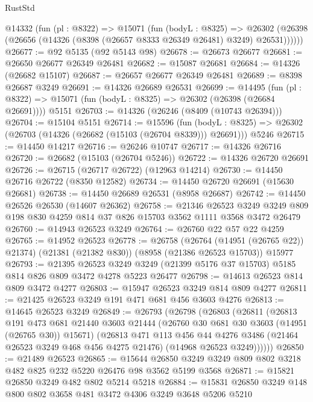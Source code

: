 \begin{lexlean}{RustStd}
\begin{coremodule}
    @14332
      (fun (pl : @8322) =>
      @15071
        (fun (bodyL : @8325) =>
        @26302 (@26398 (@26656 (@14326 (@8398 (@26657 @8333 @26349 @26481) @3249) @26531))))))
@26677 := @92 @5135 (@92 @5143 @98)
@26678 := @26673 @26677
@26681 := @26650 @26677 @26349 @26481
@26682 := @15087 @26681
@26684 := @14326 (@26682 @15107)
@26687 := @26657 @26677 @26349 @26481
@26689 := @8398 @26687 @3249
@26691 := @14326 @26689 @26531
@26699 := @14495
    (fun (pl : @8322) => @15071 (fun (bodyL : @8325) => @26302 (@26398 (@26684 @26691))))
    @5151
@26703 := @14326 (@26246 (@8409 (@10743 @26394)))
@26704 := @15104 @5151
@26714 := @15596
    (fun (bodyL : @8325) => @26302 (@26703 (@14326 (@26682 (@15103 (@26704 @8339))) @26691)))
    @5246
@26715 := @14450 @14217
@26716 := @26246 @10747
@26717 := @14326 @26716
@26720 := @26682 (@15103 (@26704 @5246))
@26722 := @14326 @26720 @26691
@26726 := @26715 (@26717 @26722) (@12963 @14214)
@26730 := @14450 @26716 @26722 (@8350 @12582)
@26734 := @14450 @26720 @26691 (@15630 @26681)
@26738 := @14450 @26689 @26531 (@8958 @26687)
@26742 := @14450 @26526 @26530 (@14607 @26362)
@26758 := @21346
    @26523
    @3249
    @3249
    @809
    @198
    @830
    @4259
    @814
    @37
    @826
    @15703
    @3562
    @1111
    @3568
    @3472
    @26479
@26760 := @14943 @26523 @3249
@26764 := @26760 @22 @57 @22 @4259
@26765 := @14952 @26523
@26778 := @26758
    (@26764 (@14951 (@26765 @22)) @21374)
    (@21381 (@21382 @830))
    (@8958 (@21386 @26523 @15703))
    @15977
@26793 := @21395
    @26523
    @3249
    @3249
    (@21399 @5176 @37 @15703)
    @5185
    @814
    @826
    @809
    @3472
    @4278
    @5223
    @26477
@26798 := @14613 @26523 @814 @809 @3472 @4277
@26803 := @15947 @26523 @3249 @814 @809 @4277
@26811 := @21425 @26523 @3249 @191 @471 @681 @456 @3603 @4276
@26813 := @14645 @26523 @3249
@26849 := @26793
    (@26798
      (@26803
        (@26811
          (@26813
            @191
            @473
            @681
            @21440
            @3603
            @21444
            (@26760 @30 @681 @30 @3603 (@14951 (@26765 @30)) @15671)
            (@26813
              @471
              @113
              @456
              @44
              @4276
              @3486
              (@21464 @26523 @3249 @468 @456 @4275 @21476)
              (@14968 @26523 @3249))))))
@26850 := @21489 @26523
@26865 := @15644
    @26850
    @3249
    @3249
    @809
    @802
    @3218
    @482
    @825
    @232
    @5220
    @26476
    @98
    @3562
    @5199
    @3568
@26871 := @15821 @26850 @3249 @482 @802 @5214 @5218
@26884 := @15831 @26850 @3249 @148 @800 @802 @3658 @481 @3472 @4306 @3249 @3648 @5206 @5210

\end{coremodule}
\end{lexlean}
